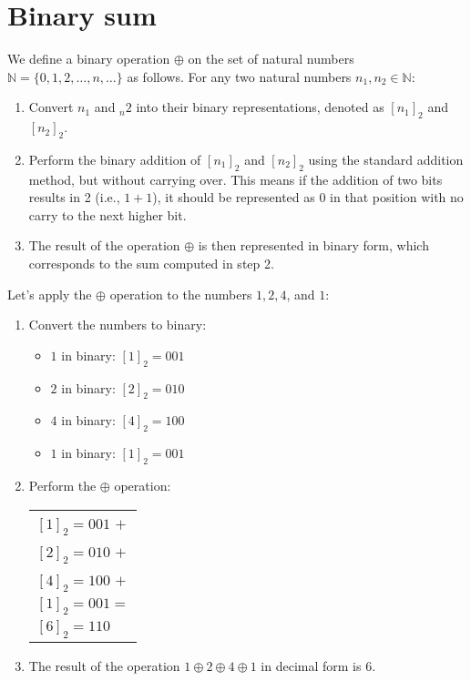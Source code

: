 \section{Binary sum}

We define a binary operation $\oplus$ on the set of natural numbers $\mathbb{N}=\{0, 1, 2, \dots, n, \dots \}$ as follows.
For any two natural numbers $n_1,n_2 \in \mathbb{N}$:
\begin{enumerate}
    \item Convert $n_1$ and $_n2$ into their binary representations, denoted as $[n_1]_2$ and $[n_2]_2$. 
    \item Perform the binary addition of  $[n_1]_2$ and $[n_2]_2$ using the standard addition method, but without carrying over.
        This means if the addition of two bits results in 2 (i.e., $1 + 1$), it should be represented as 0 in that position with no carry to the next higher bit.
    \item The result of the operation $\oplus$ is then represented in binary form, which corresponds to the sum computed in step 2.
\end{enumerate}

\begin{example}
    Let's apply the $\oplus$ operation to the numbers $1,2,4$, and $1$: 
    \begin{enumerate}
        \item Convert the numbers to binary: 
            \begin{itemize}
                \item $1$ in binary: $[1]_2=001$
                \item $2$ in binary: $[2]_2=010$
                \item $4$ in binary: $[4]_2=100$
                \item $1$ in binary: $[1]_2=001$
            \end{itemize}
        \item Perform the $\oplus$ operation:
            \begin{table}[H]
                \centering
                \begin{tabular}{l}
                    $[1]_2=001$ $+$ \\ 
                    $[2]_2=010$ $+$ \\ 
                    $[4]_2=100$ $+$\\
                    $[1]_2=001=$ \\
                    \hline
                    $[6]_2=110$
                \end{tabular}
            \end{table}
        \item The result of the operation $1\oplus 2\oplus 4\oplus 1$ in decimal form is 6.
    \end{enumerate}
\end{example}